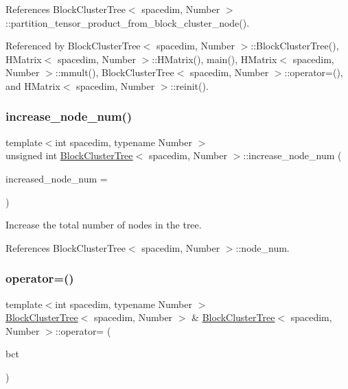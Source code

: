References Block\+Cluster\+Tree$<$ spacedim, Number $>$\+::partition\+\_\+tensor\+\_\+product\+\_\+from\+\_\+block\+\_\+cluster\+\_\+node().



Referenced by Block\+Cluster\+Tree$<$ spacedim, Number $>$\+::\+Block\+Cluster\+Tree(), H\+Matrix$<$ spacedim, Number $>$\+::\+H\+Matrix(), main(), H\+Matrix$<$ spacedim, Number $>$\+::mmult(), Block\+Cluster\+Tree$<$ spacedim, Number $>$\+::operator=(), and H\+Matrix$<$ spacedim, Number $>$\+::reinit().

\mbox{\label{classBlockClusterTree_aec9920e5b215fbfe2aa9f54980d3b30a}} 
\subsubsection{\texorpdfstring{increase\+\_\+node\+\_\+num()}{increase\_node\_num()}}
{\footnotesize\ttfamily template$<$int spacedim, typename Number $>$ \\
unsigned int \hyperlink{classBlockClusterTree}{Block\+Cluster\+Tree}$<$ spacedim, Number $>$\+::increase\+\_\+node\+\_\+num (\begin{DoxyParamCaption}\item[{unsigned int}]{increased\+\_\+node\+\_\+num = {} }\end{DoxyParamCaption})}

Increase the total number of nodes in the tree. 

References Block\+Cluster\+Tree$<$ spacedim, Number $>$\+::node\+\_\+num.

\mbox{\label{classBlockClusterTree_a85553cc442e419b8d707720312118328}} 
\subsubsection{\texorpdfstring{operator=()}{operator=()}\hspace{0.1cm}{\footnotesize\ttfamily [1/2]}}
{\footnotesize\ttfamily template$<$int spacedim, typename Number $>$ \\
\hyperlink{classBlockClusterTree}{Block\+Cluster\+Tree}$<$ spacedim, Number $>$ \& \hyperlink{classBlockClusterTree}{Block\+Cluster\+Tree}$<$ spacedim, Number $>$\+::operator= (\begin{DoxyParamCaption}\item[{const \hyperlink{classBlockClusterTree}{Block\+Cluster\+Tree}$<$ spacedim, Number $>$ \&}]{bct }\end{DoxyParamCaption})}

